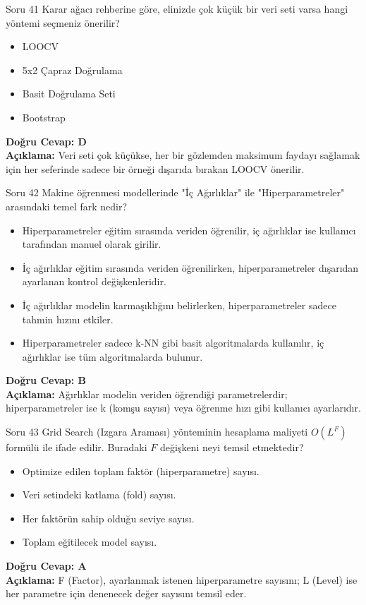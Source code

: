 \documentclass[12pt,a4paper]{article}
\begin{document}
\begin{testcard}{Soru 41}
    Karar ağacı rehberine göre, elinizde çok küçük bir veri seti varsa hangi yöntemi seçmeniz önerilir?
    \begin{itemize}
        \item[A)] LOOCV
        \item[B)] 5x2 Çapraz Doğrulama
        \item[C)] Basit Doğrulama Seti
        \item[D)] Bootstrap
    \end{itemize}
    \tcblower
    \textbf{Doğru Cevap: D} \\
    \textbf{Açıklama:} Veri seti çok küçükse, her bir gözlemden maksimum faydayı sağlamak için her seferinde sadece bir örneği dışarıda bırakan LOOCV önerilir.
\end{testcard}

\begin{testcard}{Soru 42}
    Makine öğrenmesi modellerinde "İç Ağırlıklar" ile "Hiperparametreler" arasındaki temel fark nedir?
    \begin{itemize}
        \item[A)] Hiperparametreler eğitim sırasında veriden öğrenilir, iç ağırlıklar ise kullanıcı tarafından manuel olarak girilir.
        \item[B)] İç ağırlıklar eğitim sırasında veriden öğrenilirken, hiperparametreler dışarıdan ayarlanan kontrol değişkenleridir.
        \item[C)] İç ağırlıklar modelin karmaşıklığını belirlerken, hiperparametreler sadece tahmin hızını etkiler.
        \item[D)] Hiperparametreler sadece k-NN gibi basit algoritmalarda kullanılır, iç ağırlıklar ise tüm algoritmalarda bulunur.
    \end{itemize}
    \tcblower
    \textbf{Doğru Cevap: B} \\
    \textbf{Açıklama:} Ağırlıklar modelin veriden öğrendiği parametrelerdir; hiperparametreler ise k (komşu sayısı) veya öğrenme hızı gibi kullanıcı ayarlarıdır.
\end{testcard}

\begin{testcard}{Soru 43}
    Grid Search (Izgara Araması) yönteminin hesaplama maliyeti $O(L^F)$ formülü ile ifade edilir. Buradaki $F$ değişkeni neyi temsil etmektedir?
    \begin{itemize}
        \item[A)] Optimize edilen toplam faktör (hiperparametre) sayısı.
        \item[B)] Veri setindeki katlama (fold) sayısı.
        \item[C)] Her faktörün sahip olduğu seviye sayısı.
        \item[D)] Toplam eğitilecek model sayısı.
    \end{itemize}
    \tcblower
    \textbf{Doğru Cevap: A} \\
    \textbf{Açıklama:} F (Factor), ayarlanmak istenen hiperparametre sayısını; L (Level) ise her parametre için denenecek değer sayısını temsil eder.
\end{testcard}
\end{document}
